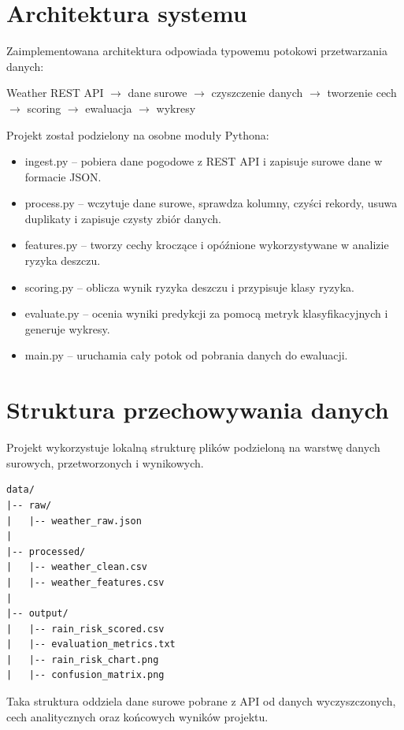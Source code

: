 \documentclass[12pt,a4paper]{article}
\begin{document}
\section{Architektura systemu}

Zaimplementowana architektura odpowiada typowemu potokowi przetwarzania danych:

\begin{center}
Weather REST API $\rightarrow$ dane surowe $\rightarrow$ czyszczenie danych $\rightarrow$ tworzenie cech $\rightarrow$ scoring $\rightarrow$ ewaluacja $\rightarrow$ wykresy
\end{center}

Projekt został podzielony na osobne moduły Pythona:

\begin{itemize}
\item ingest.py -- pobiera dane pogodowe z REST API i zapisuje surowe dane w formacie JSON.
\item process.py -- wczytuje dane surowe, sprawdza kolumny, czyści rekordy, usuwa duplikaty i zapisuje czysty zbiór danych.
\item features.py -- tworzy cechy kroczące i opóźnione wykorzystywane w analizie ryzyka deszczu.
\item scoring.py -- oblicza wynik ryzyka deszczu i przypisuje klasy ryzyka.
\item evaluate.py -- ocenia wyniki predykcji za pomocą metryk klasyfikacyjnych i generuje wykresy.
\item main.py -- uruchamia cały potok od pobrania danych do ewaluacji.
\end{itemize}

\section{Struktura przechowywania danych}

Projekt wykorzystuje lokalną strukturę plików podzieloną na warstwę danych surowych, przetworzonych i wynikowych.

\begin{verbatim}
data/
|-- raw/
|   |-- weather_raw.json
|
|-- processed/
|   |-- weather_clean.csv
|   |-- weather_features.csv
|
|-- output/
|   |-- rain_risk_scored.csv
|   |-- evaluation_metrics.txt
|   |-- rain_risk_chart.png
|   |-- confusion_matrix.png
\end{verbatim}

Taka struktura oddziela dane surowe pobrane z API od danych wyczyszczonych, cech analitycznych oraz końcowych wyników projektu.
\end{document}
